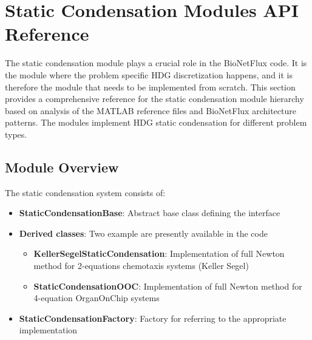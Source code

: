 %

\section{Static Condensation Modules API Reference}
\label{sec:static_condensation_modules_api}


The static condensation module plays a crucial role in the BioNetFlux code. It is the module where the  problem specific HDG discretization happens, and it is therefore the module that needs to be implemented from scratch. This section provides a comprehensive reference for the static condensation module hierarchy based on analysis of the MATLAB reference files and BioNetFlux architecture patterns. The modules implement HDG static condensation for different problem types.

\subsection{Module Overview}

The static condensation system consists of:
\begin{itemize}
    \item \textbf{StaticCondensationBase}: Abstract base class defining the interface
    \item \textbf{Derived classes}:
    Two example are presently available in the code
   \begin{itemize}
    \item \textbf{KellerSegelStaticCondensation}: Implementation of full Newton method for 2-equations chemotaxis systems (Keller Segel)
    \item \textbf{StaticCondensationOOC}: Implementation of full Newton method for 4-equation OrganOnChip systems
   \end{itemize}
    \item \textbf{StaticCondensationFactory}: Factory for referring to the appropriate implementation
\end{itemize}

